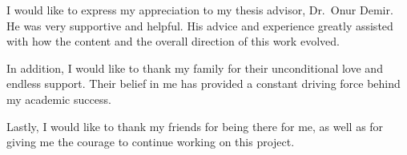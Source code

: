 \begin{acknowledgements}

I would like to express my appreciation to my thesis advisor, Dr.~Onur Demir. He was very supportive and helpful. His advice and experience greatly assisted with how the content and the overall direction of this work evolved.

In addition, I would like to thank my family for their unconditional love and endless support. Their belief in me has provided a constant driving force behind my academic success.

Lastly, I would like to thank my friends for being there for me, as well as for giving me the courage to continue working on this project.

\end{acknowledgements}
